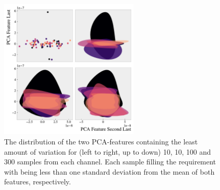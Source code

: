 \begin{figure}
    \centering
    \includegraphics[width=0.6\textwidth]{Figures/MLResults/DataHandling/PCA/PCAPlotLast.pdf}
    \caption[The value distribution of the two last \acs{PCA}-features.]{The distribution of the two 
    \ac{PCA}-features containing the least amount of variation for (left to right, up to down) 10, 
    10, 100 and 300 samples from each channel. Each sample filling the requirement with being less 
    than one standard deviation from the mean of both features, respectively.}
    \label{fig:PCA2}
\end{figure}


